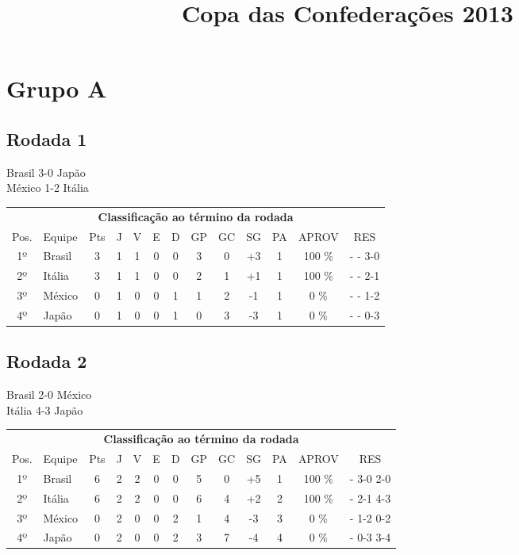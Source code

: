 \documentclass{article}
\title{\textbf{Copa das Confederações 2013}}
\author{}
\date{}
\begin{document}
\maketitle

\section*{Grupo A}
\subsection*{Rodada 1}
Brasil 3-0 Japão\\
México 1-2 Itália\\
\begin{center}
\begin{tabular}{| c | l | c | c | c | c | c | c | c | c | c | c | c |}
\multicolumn{13}{c}{\textbf{Classificação ao término da rodada}}\\
Pos.&Equipe&Pts&J&V&E&D&GP&GC&SG&PA&APROV&RES\\
1º&Brasil              &3&1	&1&0&0	&3&0&+3	&1&100 \%	& -  - 3-0 \\
2º&Itália              &3&1	&1&0&0	&2&1&+1	&1&100 \%	& -  - 2-1 \\
3º&México              &0&1	&0&0&1	&1&2&-1	&1&  0 \%	& -  - 1-2 \\
4º&Japão               &0&1	&0&0&1	&0&3&-3	&1&  0 \%	& -  - 0-3 \\
\end{tabular}
\end{center}


\subsection*{Rodada 2}
Brasil 2-0 México\\
Itália 4-3 Japão\\
\begin{center}
\begin{tabular}{| c | l | c | c | c | c | c | c | c | c | c | c | c |}
\multicolumn{13}{c}{\textbf{Classificação ao término da rodada}}\\
Pos.&Equipe&Pts&J&V&E&D&GP&GC&SG&PA&APROV&RES\\
1º&Brasil              &6&2	&2&0&0	&5&0&+5	&1&100 \%	& - 3-0 2-0 \\
2º&Itália              &6&2	&2&0&0	&6&4&+2	&2&100 \%	& - 2-1 4-3 \\
3º&México              &0&2	&0&0&2	&1&4&-3	&3&  0 \%	& - 1-2 0-2 \\
4º&Japão               &0&2	&0&0&2	&3&7&-4	&4&  0 \%	& - 0-3 3-4 \\
\end{tabular}
\end{center}
\end{document}
